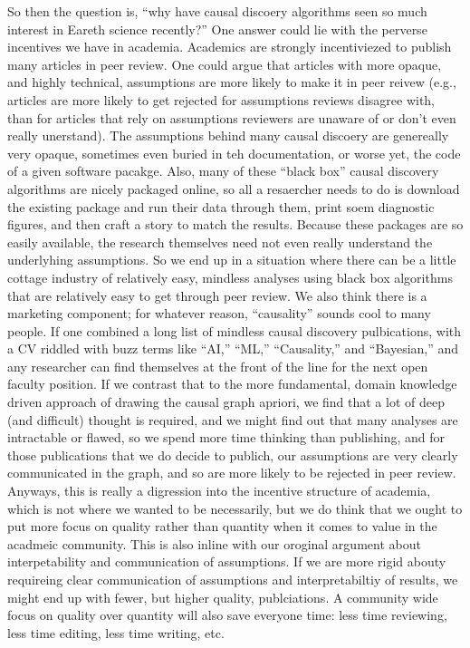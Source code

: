 \documentclass[12pt]{article}
\begin{document}
So then the question is, ``why have causal discoery algorithms seen so
much interest in Eareth science recently?'' One answer could lie with
the perverse incentives we have in academia. Academics are strongly
incentiviezed to publish many articles in peer review. One could argue
that articles with more opaque, and highly technical, assumptions are
more likely to make it in peer reivew (e.g., articles are more likely
to get rejected for assumptions reviews disagree with, than for
articles that rely on assumptions reviewers are unaware of or don't
even really unerstand). The assumptions behind many causal discoery
are genereally very opaque, sometimes even buried in teh
documentation, or worse yet, the code of a given software
pacakge. Also, many of these ``black box'' causal discovery algorithms
are nicely packaged online, so all a resaercher needs to do is
download the existing package and run their data through them, print
soem diagnostic figures, and then craft a story to match the
results. Because these packages are so easily available, the research
themselves need not even really understand the underlyhing
assumptions. So we end up in a situation where there can be a little
cottage industry of relatively easy, mindless analyses using black box
algorithms that are relatively easy to get through peer review. We
also think there is a marketing component; for whatever reason,
``causality'' sounds cool to many people. If one combined a long list
of mindless causal discovery pulbications, with a CV riddled with buzz
terms like ``AI,'' ``ML,'' ``Causality,'' and ``Bayesian,'' and any
researcher can find themselves at the front of the line for the next
open faculty position. If we contrast that to the more fundamental,
domain knowledge driven approach of drawing the causal graph apriori,
we find that a lot of deep (and difficult) thought is required, and we
might find out that many analyses are intractable or flawed, so we
spend more time thinking than publishing, and for those publications
that we do decide to publich, our assumptions are very clearly
communicated in the graph, and so are more likely to be rejected in
peer review. Anyways, this is really a digression into the incentive
structure of academia, which is not where we wanted to be necessarily,
but we do think that we ought to put more focus on quality rather than
quantity when it comes to value in the acadmeic community. This is
also inline with our oroginal argument about interpetability and
communication of assumptions. If we are more rigid abouty requireing
clear communication of assumptions and interpretabiltiy of results, we
might end up with fewer, but higher quality, publciations. A community
wide focus on quality over quantity will also save everyone time: less
time reviewing, less time editing, less time writing, etc.
\end{document}
